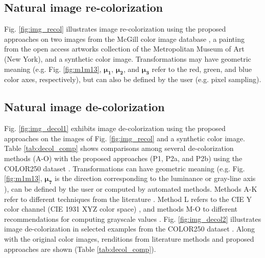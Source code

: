 \documentclass[superscriptaddress,longbibliography,aps,prl,twocolumn,10pt]{revtex4-2}
\begin{document}
\subsection*{\normalsize{Natural image re-colorization}}
Fig. \ref{fig:img_recol} illustrates image re-colorization using the proposed approaches on two images from the McGill color image database \cite{Olmos2004}, a painting from the open access artworks collection of the Metropolitan Museum of Art (New York), and a synthetic color image. Transformations may have geometric meaning (e.g. Fig. \ref{fig:m1m13}, $\boldsymbol{\mu_1}$, $\boldsymbol{\mu_2}$, and $\boldsymbol{\mu_3}$ refer to the red, green, and blue color axes, respectively), but can also be defined by the user (e.g. pixel sampling).

\subsection*{\normalsize{Natural image de-colorization}}
Fig. \ref{fig:img_decol1} exhibits image de-colorization using the proposed approaches on the images of Fig. \ref{fig:img_recol} and a synthetic color image. Table \ref{tab:decol_comp} shows comparisons among several de-colorization methods (A-O) with the proposed approaches (P1, P2a, and P2b) using the COLOR250 dataset \cite{Lu2014}. Transformations can have geometric meaning (e.g. Fig. \ref{fig:m1m13}, $\boldsymbol{\mu_7}$ is the direction corresponding to the luminance or gray-line axis \cite{Moxey2003, Ell2007a}), can be defined by the user or computed by automated methods. Methods A-K refer to different techniques from the literature \cite{Lu2014, CewuLu2012, Grundland2007, Smith2008, Gooch2005, Nafchi2017, QiegenLiu2015, Liu2017a, Xiong2017, Liu2016, Liu2017b}. Method L refers to the CIE Y color channel (CIE 1931 XYZ color space) \cite{Hunt2011}, and methods M-O to different recommendations for computing grayscale values \cite{InternationalTelecommunicationUnion2011, ITU-R_BT709, ITU-R_BT.2100}. Fig. \ref{fig:img_decol2} illustrates image de-colorization in selected examples from the COLOR250 dataset \cite{Lu2014}. Along with the original color images, renditions from literature methods and proposed approaches are shown (Table \ref{tab:decol_comp}).
\end{document}
